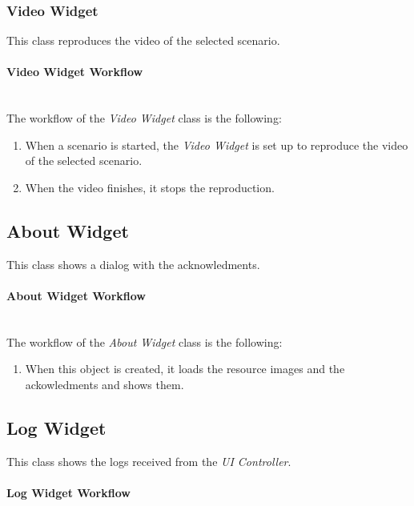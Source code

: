 \subsubsection{Video Widget}

This class reproduces the video  of the selected scenario. 

\paragraph{Video Widget Workflow}~\\

The workflow of the \emph{Video Widget} class is the following:
\begin{enumerate}
\item When a scenario is started, the \emph{Video Widget} is set up to reproduce the video of the selected scenario.\item When the video finishes, it stops the reproduction.
\end{enumerate}


\subsection{About Widget}
This class shows a dialog with the acknowledments. 

\paragraph{About Widget  Workflow}~\\

The workflow of the \emph{About Widget} class is the following:
\begin{enumerate}
\item When this object is created, it loads the resource images and the ackowledments and shows them.
\end{enumerate}

\subsection{Log Widget}

This class shows the logs received from the \emph{UI Controller}. 

\paragraph{Log Widget  Workflow}~\\

